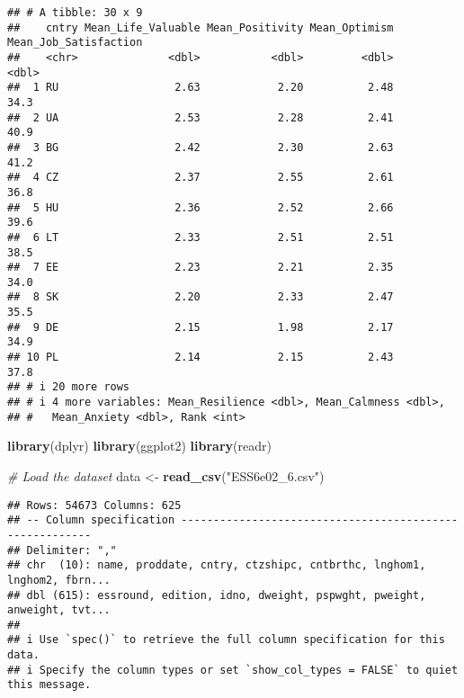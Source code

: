 \documentclass[
]{article}
\newenvironment{Shaded}{\begin{snugshade}}{\end{snugshade}}
\newcommand{\CommentTok}[1]{\textcolor[rgb]{0.56,0.35,0.01}{\textit{#1}}}
\newcommand{\FunctionTok}[1]{\textcolor[rgb]{0.13,0.29,0.53}{\textbf{#1}}}
\newcommand{\NormalTok}[1]{#1}
\newcommand{\OtherTok}[1]{\textcolor[rgb]{0.56,0.35,0.01}{#1}}
\newcommand{\StringTok}[1]{\textcolor[rgb]{0.31,0.60,0.02}{#1}}
\begin{document}
\begin{verbatim}
## # A tibble: 30 x 9
##    cntry Mean_Life_Valuable Mean_Positivity Mean_Optimism Mean_Job_Satisfaction
##    <chr>              <dbl>           <dbl>         <dbl>                 <dbl>
##  1 RU                  2.63            2.20          2.48                  34.3
##  2 UA                  2.53            2.28          2.41                  40.9
##  3 BG                  2.42            2.30          2.63                  41.2
##  4 CZ                  2.37            2.55          2.61                  36.8
##  5 HU                  2.36            2.52          2.66                  39.6
##  6 LT                  2.33            2.51          2.51                  38.5
##  7 EE                  2.23            2.21          2.35                  34.0
##  8 SK                  2.20            2.33          2.47                  35.5
##  9 DE                  2.15            1.98          2.17                  34.9
## 10 PL                  2.14            2.15          2.43                  37.8
## # i 20 more rows
## # i 4 more variables: Mean_Resilience <dbl>, Mean_Calmness <dbl>,
## #   Mean_Anxiety <dbl>, Rank <int>
\end{verbatim}

\begin{Shaded}
\begin{Highlighting}[]
\FunctionTok{library}\NormalTok{(dplyr)}
\FunctionTok{library}\NormalTok{(ggplot2)}
\FunctionTok{library}\NormalTok{(readr)}

\CommentTok{\# Load the dataset}
\NormalTok{data }\OtherTok{\textless{}{-}} \FunctionTok{read\_csv}\NormalTok{(}\StringTok{"ESS6e02\_6.csv"}\NormalTok{)}
\end{Highlighting}
\end{Shaded}

\begin{verbatim}
## Rows: 54673 Columns: 625
## -- Column specification --------------------------------------------------------
## Delimiter: ","
## chr  (10): name, proddate, cntry, ctzshipc, cntbrthc, lnghom1, lnghom2, fbrn...
## dbl (615): essround, edition, idno, dweight, pspwght, pweight, anweight, tvt...
## 
## i Use `spec()` to retrieve the full column specification for this data.
## i Specify the column types or set `show_col_types = FALSE` to quiet this message.
\end{verbatim}
\end{document}
